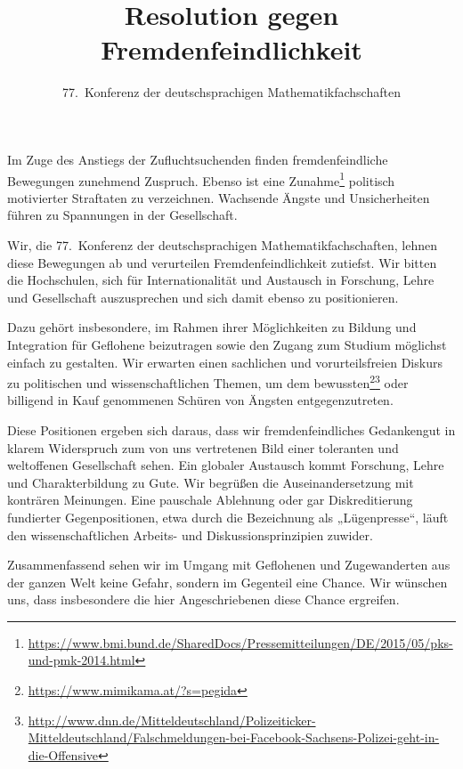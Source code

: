 \documentclass[12pt,a4paper,ngerman,DIV=14,draft]{scrartcl}
\author{77.~Konferenz der deutschsprachigen Mathematikfachschaften}
\title{Resolution gegen Fremdenfeindlichkeit}
\begin{document}
\maketitle{}


Im Zuge des Anstiegs der Zufluchtsuchenden finden fremdenfeindliche
Bewegungen zunehmend Zuspruch. Ebenso ist eine
Zunahme\footnote{\url{https://www.bmi.bund.de/SharedDocs/Pressemitteilungen/DE/2015/05/pks-und-pmk-2014.html}}
politisch motivierter Straftaten zu verzeichnen. Wachsende Ängste und
Unsicherheiten führen zu Spannungen in der Gesellschaft.

Wir, die 77.~Konferenz der deutschsprachigen Mathematikfachschaften,
lehnen diese Bewegungen ab und verurteilen Fremdenfeindlichkeit
zutiefst. Wir bitten die Hochschulen, sich für Internationalität und
Austausch in Forschung, Lehre und Gesellschaft auszusprechen und sich
damit ebenso zu positionieren.

Dazu gehört insbesondere, im Rahmen ihrer Möglichkeiten zu Bildung und
Integration für Geflohene beizutragen sowie den Zugang zum Studium
möglichst einfach zu gestalten. Wir erwarten einen sachlichen und
vorurteilsfreien Diskurs zu politischen und wissenschaftlichen Themen,
um dem
bewussten\footnote{\url{https://www.mimikama.at/?s=pegida}}\footnote{\url{http://www.dnn.de/Mitteldeutschland/Polizeiticker-Mitteldeutschland/Falschmeldungen-bei-Facebook-Sachsens-Polizei-geht-in-die-Offensive}}
oder billigend in Kauf genommenen Schüren von Ängsten
entgegenzutreten.

Diese Positionen ergeben sich daraus, dass wir fremdenfeindliches
Gedankengut in klarem Widerspruch zum von uns vertretenen Bild einer
toleranten und weltoffenen Gesellschaft sehen. Ein globaler Austausch
kommt Forschung, Lehre und Charakterbildung zu Gute. Wir begrüßen die
Auseinandersetzung mit konträren Meinungen. Eine pauschale Ablehnung
oder gar Diskreditierung fundierter Gegenpositionen, etwa durch die
Bezeichnung als „Lügenpresse“, läuft den wissenschaftlichen Arbeits-
und Diskussionsprinzipien zuwider.

Zusammenfassend sehen wir im Umgang mit Geflohenen und Zugewanderten
aus der ganzen Welt keine Gefahr, sondern im Gegenteil eine
Chance. Wir wünschen uns, dass insbesondere die hier Angeschriebenen
diese Chance ergreifen.
\end{document}
